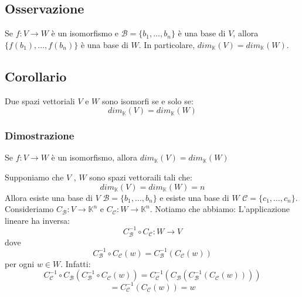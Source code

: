 \documentclass[a4paper]{article}
\theoremstyle{break}
\theoremstyle{break}
\theoremstyle{break}
\theoremstyle{break}
\begin{document}
\subsection{Osservazione}
Se \( f: V \to W \) è un isomorfismo e \( \mathcal{B} = \{b_1, \ldots, b_n\}  \) è una
base di \( V \), allora \( \{f(b_1), \ldots, f(b_n)\}  \) è una base di \( W \). In
particolare, \( dim_{\mathbb{K}}(V) = dim_{\mathbb{K}}(W) \).

\subsection{Corollario}
Due spazi vettoriali \( V \) e \( W \) sono isomorfi se e solo se:
\[
  dim_{\mathbb{K}}(V) = dim_{\mathbb{K}}(W)
\] 

\subsubsection{Dimostrazione}
Se \( f: V \to W \) è un isomorfismo, allora \( dim_{\mathbb{K}}(V) = dim_{\mathbb{K}}(W) \) 

\vspace{1em}
\noindent Supponiamo che \( V \) , \( W \) sono spazi vettoraili tali che:
\[
dim_{\mathbb{K}}(V) = dim_{\mathbb{K}}(W) = n
\] 
Allora esiste una base di \( V \) \( \mathcal{B} = \{b_1, \ldots, b_n\}  \) e
esiste una base di \( W \) \( \mathcal{C} = \{c_1, \ldots, c_n\}  \).
Consideriamo \( C_{\mathcal{B}}: V \to \mathbb{K}^n \) e \( C_{\mathcal{C}}: W \to \mathbb{K}^n \).
Notiamo che abbiamo:
\label{D1}
L'applicazione lineare ha inversa:
\[
C_{\mathcal{B}}^{-1} \circ C_{\mathcal{C}}: W \to V
\] 
dove
\[
C_{\mathcal{B}}^{-1} \circ C_{\mathcal{C}}(w) = C_{\mathcal{B}}^{-1}(C_{\mathcal{C}}(w))
\] 
per ogni \( w \in W \). Infatti:
\[
  C_{\mathcal{C}}^{-1} \circ C_{\mathcal{B}}\left( C_{\mathcal{B}}^{-1} \circ C_{\mathcal{C}}(w) \right) =
  C_{\mathcal{C}}^{-1} \left( C_{\mathcal{B}} \left( C_{\mathcal{B}}^{-1} \left( C_{\mathcal{C}}(w) \right)  \right)  \right) 
\] 
\[
  = C_{\mathcal{C}}^{-1} \left( C_{\mathcal{C}}(w) \right) = w
\] 
\end{document}
